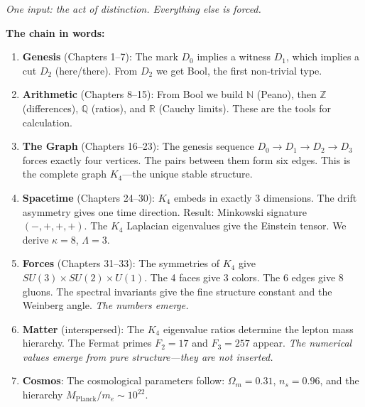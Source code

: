 \documentclass[11pt,a4paper]{book}
\begin{document}
\begin{center}
\end{center}

\medskip
\noindent\textit{One input: the act of distinction. Everything else is forced.}

\bigskip

\noindent\textbf{The chain in words:}

\begin{enumerate}
\item \textbf{Genesis} (Chapters 1--7): The mark $D_0$ implies a witness $D_1$, which 
implies a cut $D_2$ (here/there). From $D_2$ we get Bool, the first non-trivial type.

\item \textbf{Arithmetic} (Chapters 8--15): From Bool we build $\mathbb{N}$ (Peano), 
then $\mathbb{Z}$ (differences), $\mathbb{Q}$ (ratios), and $\mathbb{R}$ (Cauchy limits). 
These are the tools for calculation.

\item \textbf{The Graph} (Chapters 16--23): The genesis sequence $D_0 \to D_1 \to D_2 \to D_3$ 
forces exactly four vertices. The pairs between them form six edges. This is the complete 
graph $K_4$---the unique stable structure.

\item \textbf{Spacetime} (Chapters 24--30): $K_4$ embeds in exactly 3 dimensions. The 
drift asymmetry gives one time direction. Result: Minkowski signature $(-,+,+,+)$. 
The $K_4$ Laplacian eigenvalues give the Einstein tensor. We derive $\kappa = 8$, 
$\Lambda = 3$.

\item \textbf{Forces} (Chapters 31--33): The symmetries of $K_4$ give $SU(3) \times SU(2) \times U(1)$. 
The 4 faces give 3 colors. The 6 edges give 8 gluons. The spectral invariants give 
the fine structure constant and the Weinberg angle. \emph{The numbers emerge.}

\item \textbf{Matter} (interspersed): The $K_4$ eigenvalue ratios determine the lepton mass hierarchy. The Fermat primes $F_2 = 17$ and $F_3 = 257$ appear. \emph{The numerical values emerge from pure structure---they are not inserted.}

\item \textbf{Cosmos}: The cosmological parameters follow: $\Omega_m = 0.31$, 
$n_s = 0.96$, and the hierarchy $M_{\text{Planck}}/m_e \sim 10^{22}$.
\end{enumerate}
\end{document}
